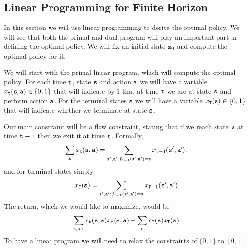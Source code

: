 
\begin{leftbar}

\section{Linear Programming for Finite Horizon}
\label{sec:ddp-FH-LP}


In this section we will use linear programming to derive the optimal
policy. We will see that both the primal and dual program will play
an important part in defining the optimal policy. We will fix an
initial state ${\tt s}_0$ and compute the optimal policy for it.

We will start with the primal linear program, which will compute the
optimal policy. For each time ${\tt t}$, state ${\tt s}$ and action
${\tt a}$ we will have a variable $x_{{\tt t}}({\tt s},{\tt a})\in\{0,1\}$ that
will indicate by $1$ that at time ${\tt t}$ we are at state ${\tt s}$
and perform action ${\tt a}$. For the terminal states ${\tt s}$ we
will have a variable $x_{{\tt T}}({\tt s})\in\{0,1\}$ that will
indicate whether we terminate at state ${\tt s}$.

Our main constraint will be a flow constraint, stating that if we
reach state ${\tt s}$ at time ${\tt t}-1$ then we exit it at time
${\tt t}$. Formally,
\[
\sum_{{\tt a}}
x_{{\tt t}}({\tt s},{\tt a})=\sum_{{\tt s}',{\tt a}':f_{{\tt t}-1}({\tt s}',{\tt a}')={\tt s}}
x_{{\tt t}-1}({\tt s}',{\tt a}').
\]
and for terminal states simply
\[
x_{{\tt T}}({\tt s})=\sum_{{\tt s}',{\tt a}':f_{{\tt T}-1}({\tt s}',{\tt a}')={\tt s}}
x_{{\tt T}-1}({\tt s}',{\tt a}')
\]
The return, which we would like to maximize, would be
\[
\sum_{{\tt t},{\tt s},{\tt a}}
{\tt r}_{{\tt t}}({\tt s},{\tt a})x_{{\tt t}}({\tt s},{\tt a})+\sum_{{\tt s}}{\tt r}_{{\tt T}}({\tt s})x_{{\tt T}}({\tt s})
\]
To have a linear program we will need to relax the constraints of
$\{0,1\}$ to $[0,1]$


\end{leftbar}
